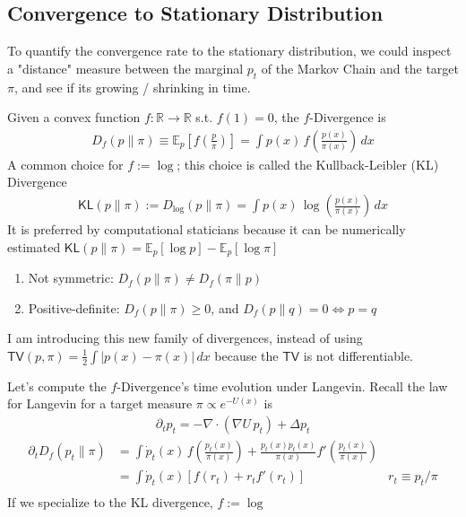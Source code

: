 \subsection{Convergence to Stationary Distribution}
To quantify the convergence rate to the stationary distribution, we could inspect a "distance" measure between the marginal $p_t$ of the Markov Chain and the target $\pi$, and see if its growing / shrinking in time.
\begin{definition}
	[$f$-Divergence] Given a convex function $f: \mathbb R \to \mathbb R$ s.t. $f(1) = 0$, the $f$-Divergence is
	\begin{align}
		D_{f}(p \| \pi) \equiv \mathbb E_{p} \left[f  \left( \frac{p }{\pi} \right) \right] = \int p(x) \, f\left(\frac{p(x)}{\pi(x)}\right) \, dx
	\end{align}
	A common choice for $f := \log$; this choice is called the Kullback-Leibler (KL) Divergence
	\begin{align}
		\textsf{KL}(p \| \pi) := D_{\log} (p \| \pi) = \int p(x) \, \log \left(\frac{p(x)}{\pi(x)}\right) \, dx
	\end{align}
	It is preferred by computational staticians because it can be numerically estimated $\textsf{KL}(p \| \pi) = \mathbb E_p [\log p]   - \mathbb E_p [\log \pi]$
\end{definition}
\begin{property}
	\begin{enumerate}
		\item Not symmetric: $D_f(p \| \pi) \neq D_f(\pi \| p)$
		\item Positive-definite: $D_f(p \| \pi) \geq 0$, and $D_f(p \| q) = 0 \iff p = q$		
	\end{enumerate}
\end{property}
I am introducing this new family of divergences, instead of using $\textsf{TV}(p, \pi) = \frac{1}{2} \int |p(x) - \pi(x)| \, dx$ because the $\textsf{TV}$ is not differentiable. 
\begin{eg} Let's compute the $f$-Divergence's time evolution under Langevin. Recall the law for Langevin for a target measure $\pi \propto e^{-U(x)}$ is
	\begin{align}
		\partial_t p_t = - \nabla \cdot (\nabla U\, p_t) + \Delta p_t
	\end{align}
	\begin{align}
		\partial_t D_f(p_t \| \pi) & = \int \dot p_t (x) \, f \left(\frac{p_t(x)}{\pi(x)} \right) + \frac{p_t(x) \dot p_t(x)}{\pi(x)} f' \left(\frac{p_t(x)}{\pi(x)} \right)\\
		& = \int \dot p_t(x) \left[  f \left(r_t \right) + r_t f '\left(r_t\right) \right] & r_t \equiv p_t / \pi\\
	\end{align}
	If we specialize to the \textsf{KL} divergence, $f  := \log$
\end{eg}




